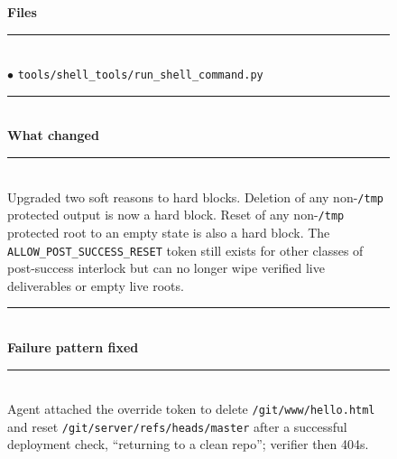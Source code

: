\begin{figure}[t]
    \centering
    \scriptsize
    \begin{tcbraster}[raster columns=2,
                      raster equal height,
                      raster column skip=4pt,
                      raster row skip=0pt,
                      raster left skip=0pt,
                      raster right skip=0pt,
                      boxrule=0.6pt,
                      left=4pt,right=4pt,top=3pt,bottom=3pt,
                      coltitle=white]
        \begin{tcolorbox}[colback=aheSky!18,colframe=aheNavy,colbacktitle=aheNavy,
                          title={\scriptsize\textbf{chg-1, iteration 8, commit \texttt{ca35f53}, level: tool implementation}}]
            \textbf{\textcolor{aheNavy}{Files}} \\
            \rule{\linewidth}{0.3pt}\\[1pt]
            $\bullet$ \texttt{tools/shell\_tools/run\_shell\_command.py} \\[3pt]
            \rule{\linewidth}{0.3pt}\\
            \textbf{\textcolor{aheNavy}{What changed}} \\
            \rule{\linewidth}{0.3pt}\\[1pt]
            Upgraded two soft reasons to hard blocks. Deletion of any non-\texttt{/tmp} protected output is now a hard block. Reset of any non-\texttt{/tmp} protected root to an empty state is also a hard block. The \texttt{ALLOW\_POST\_SUCCESS\_RESET} token still exists for other classes of post-success interlock but can no longer wipe verified live deliverables or empty live roots. \\[3pt]
            \rule{\linewidth}{0.3pt}\\
            \textbf{\textcolor{aheNavy}{Failure pattern fixed}} \\
            \rule{\linewidth}{0.3pt}\\[1pt]
            Agent attached the override token to delete \texttt{/git/www/hello.html} and reset \texttt{/git/server/refs/heads/master} after a successful deployment check, ``returning to a clean repo''; verifier then 404s. \\[3pt]

\end{tcolorbox}
\end{tcbraster}
\end{figure}
